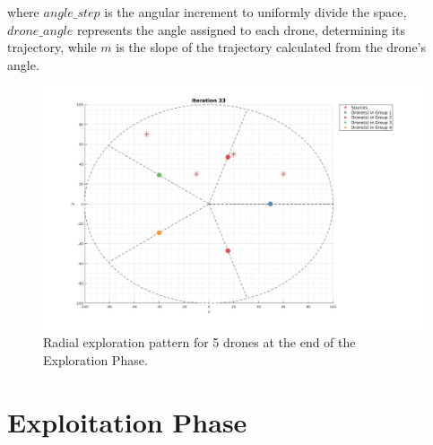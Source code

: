 where $angle\_step$ is the angular increment to uniformly divide the space, $drone\_angle$ represents the angle assigned to each drone, determining its trajectory, 
while $m$ is the slope of the trajectory calculated from the drone's angle. 

\begin{figure}
    \centering
    \includegraphics[width=\textwidth]{images/exploration_pattern.jpg} 
    \caption{Radial exploration pattern for 5 drones at the end of the Exploration Phase.}
    \label{fig:exploration_pattern}
\end{figure}

\section{Exploitation Phase}
